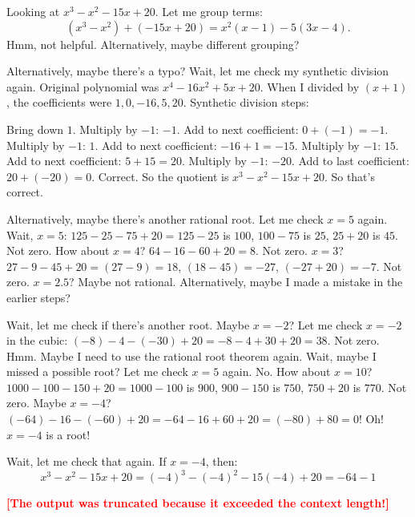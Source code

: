 \documentclass{article} %
\begin{document}
\begin{tcolorbox}[
  breakable,
  colback=gray!10,
  colframe=gray!60,
  title=Qwen3-8B often generates overly long responses,
  left=6pt,right=6pt,top=4pt,bottom=4pt,
  fontupper=\scriptsize
]
Looking at $x^3 - x^2 - 15x + 20$. Let me group terms:
\[(x^3 - x^2) + (-15x + 20) = x^2(x - 1) - 5(3x - 4).\]
Hmm, not helpful. Alternatively, maybe different grouping?

Alternatively, maybe there's a typo? Wait, let me check my synthetic division again. Original polynomial was $x^4 - 16x^2 + 5x + 20$. When I divided by $(x + 1)$, the coefficients were $1, 0, -16, 5, 20$. Synthetic division steps:

Bring down $1$. Multiply by $-1$: $-1$. Add to next coefficient: $0 + (-1) = -1$. Multiply by $-1$: $1$. Add to next coefficient: $-16 + 1 = -15$. Multiply by $-1$: $15$. Add to next coefficient: $5 + 15 = 20$. Multiply by $-1$: $-20$. Add to last coefficient: $20 + (-20) = 0$. Correct. So the quotient is $x^3 - x^2 - 15x + 20$. So that's correct.

Alternatively, maybe there's another rational root. Let me check $x= 5$ again. Wait, $x=5$: $125 - 25 - 75 + 20 = 125 - 25$ is $100$, $100 - 75$ is $25$, $25 + 20$ is $45$. Not zero. How about $x= 4$? $64 - 16 - 60 + 20 = 8$. Not zero. $x= 3$? $27 - 9 - 45 + 20 = (27-9)=18$, $(18-45)= -27$, $(-27 + 20)= -7$. Not zero. $x= 2.5$? Maybe not rational. Alternatively, maybe I made a mistake in the earlier steps?

Wait, let me check if there's another root. Maybe $x= -2$? Let me check $x=-2$ in the cubic: $(-8) - 4 - (-30) + 20 = -8 - 4 + 30 + 20 = 38$. Not zero. Hmm. Maybe I need to use the rational root theorem again. Wait, maybe I missed a possible root? Let me check $x= 5$ again. No. How about $x= 10$? $1000 - 100 - 150 + 20 = 1000 - 100$ is $900$, $900 - 150$ is $750$, $750 + 20$ is $770$. Not zero. Maybe $x= -4$? $(-64) - 16 - (-60) + 20 = -64 - 16 + 60 + 20 = (-80) + 80 = 0!$ Oh! $x = -4$ is a root!

Wait, let me check that again. If $x = -4$, then:
\[x^3 - x^2 - 15x + 20 = (-4)^3 - (-4)^2 - 15(-4) + 20 = -64 - 1\]

\textcolor{red}{\textbf{[The output was truncated because it exceeded the context length!]}}

\end{tcolorbox}
\end{document}
